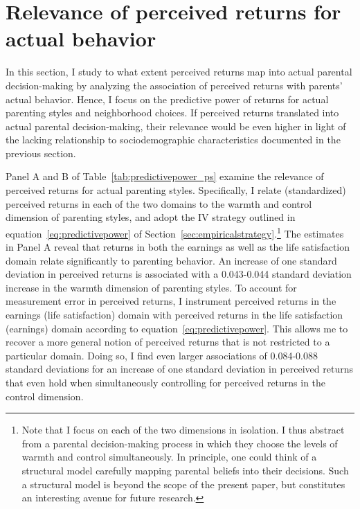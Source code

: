 \documentclass[12pt, a4paper, english]{article}
\begin{document}
\section{Relevance of perceived returns for actual behavior}\label{sec:predictivepower}
In this section, I study to what extent perceived returns map into actual parental decision-making by analyzing the association of perceived returns with parents' actual behavior. Hence, I focus on the predictive power of returns for actual parenting styles and neighborhood choices. If perceived returns translated into actual parental decision-making, their relevance would be even higher in light of the lacking relationship to sociodemographic characteristics documented in the previous section.

Panel A and B of Table~\ref{tab:predictivepower_ps} examine the relevance of perceived returns for actual parenting styles. Specifically, I relate (standardized) perceived returns in each of the two domains to the warmth and control dimension of parenting styles, and adopt the IV strategy outlined in equation~\eqref{eq:predictivepower} of Section~\ref{sec:empiricalstrategy}.\footnote{Note that I focus on each of the two dimensions in isolation. I thus abstract from a parental decision-making process in which they choose the levels of warmth and control simultaneously. In principle, one could think of a structural model carefully mapping parental beliefs into their decisions. Such a structural model is beyond the scope of the present paper, but constitutes an interesting avenue for future research.} The estimates in Panel A reveal that returns in both the earnings as well as the life satisfaction domain relate significantly to parenting behavior. An increase of one standard deviation in perceived returns is associated with a 0.043-0.044 standard deviation increase in the warmth dimension of parenting styles. To account for measurement error in perceived returns, I instrument perceived returns in the earnings (life satisfaction) domain with perceived returns in the life satisfaction (earnings) domain according to equation~\ref{eq:predictivepower}. This allows me to recover a more general notion of perceived returns that is not restricted to a particular domain. Doing so, I find even larger associations of 0.084-0.088 standard deviations for an increase of one standard deviation in perceived returns that even hold when simultaneously controlling for perceived returns in the control dimension. 
\end{document}
